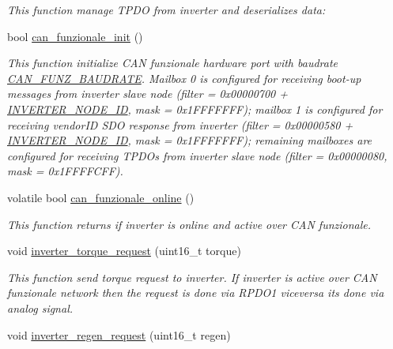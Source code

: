\begin{DoxyCompactItemize}
\begin{DoxyCompactList}\small\item\em This function manage T\+P\+DO from inverter and deserializes data\+: \end{DoxyCompactList}\item 
bool \mbox{\hyperlink{group___c_a_n__funzionale__group_ga578b28192b0c78942fcc0452d070accb}{can\+\_\+funzionale\+\_\+init}} ()
\begin{DoxyCompactList}\small\item\em This function initialize C\+AN funzionale hardware port with baudrate \mbox{\hyperlink{common_8h_adee7e3800c996a5a977034531d94570d}{C\+A\+N\+\_\+\+F\+U\+N\+Z\+\_\+\+B\+A\+U\+D\+R\+A\+TE}}. Mailbox 0 is configured for receiving boot-\/up messages from inverter slave node (filter = 0x00000700 + \mbox{\hyperlink{group___c_a_n__funzionale__group_ga59ea82aec4abe07072cbdad555a8c1b9}{I\+N\+V\+E\+R\+T\+E\+R\+\_\+\+N\+O\+D\+E\+\_\+\+ID}}, mask = 0x1\+F\+F\+F\+F\+F\+FF); mailbox 1 is configured for receiving vendor\+ID S\+DO response from inverter (filter = 0x00000580 + \mbox{\hyperlink{group___c_a_n__funzionale__group_ga59ea82aec4abe07072cbdad555a8c1b9}{I\+N\+V\+E\+R\+T\+E\+R\+\_\+\+N\+O\+D\+E\+\_\+\+ID}}, mask = 0x1\+F\+F\+F\+F\+F\+FF); remaining mailboxes are configured for receiving T\+P\+D\+Os from inverter slave node (filter = 0x00000080, mask = 0x1\+F\+F\+F\+F\+C\+FF). \end{DoxyCompactList}\item 
volatile bool \mbox{\hyperlink{group___c_a_n__funzionale__group_ga7d74fd826c5df3b86fd751f91c61671f}{can\+\_\+funzionale\+\_\+online}} ()
\begin{DoxyCompactList}\small\item\em This function returns if inverter is online and active over C\+AN funzionale. \end{DoxyCompactList}\item 
void \mbox{\hyperlink{group___c_a_n__funzionale__group_ga41854ab275f2b3cb7efb9385502d7d65}{inverter\+\_\+torque\+\_\+request}} (uint16\+\_\+t torque)
\begin{DoxyCompactList}\small\item\em This function send torque request to inverter. If inverter is active over C\+AN funzionale network then the request is done via R\+P\+D\+O1 viceversa it\textquotesingle{}s done via analog signal. \end{DoxyCompactList}\item 
void \mbox{\hyperlink{group___c_a_n__funzionale__group_ga75820e0d72b7f264a70d99f414745518}{inverter\+\_\+regen\+\_\+request}} (uint16\+\_\+t regen)

\end{DoxyCompactItemize}
